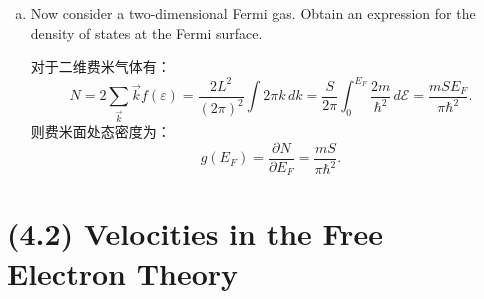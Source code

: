 \documentclass[reqno,a4paper,12pt]{amsart}
\begin{document}
\begin{enumerate}[(a)]
	\item Now consider a two-dimensional Fermi gas. Obtain an expression for the density of states at the Fermi surface. 
	
	\begin{tcolorbox}[breakable, colback = black!5!white, colframe = black]
	对于二维费米气体有：
	\[
		N = 2\sum_{\vec{k}} \vec{k} f(\varepsilon) = \frac{2L^2}{(2\pi)^2} \int 2\pi k\,dk = \frac{S}{2\pi} \int_0^{E_F} \frac{2m}{\hbar^2} \,d\mathcal{E} = \frac{mSE_F}{\pi\hbar^2}.
	\]
	则费米面处态密度为：
	\[
		g(E_F) = \frac{\partial N}{\partial E_F}= \frac{mS}{\pi\hbar^2}.
	\]
	\end{tcolorbox}
\end{enumerate}

\section{\textbf{(4.2) Velocities in the Free Electron Theory}}
\end{document}
